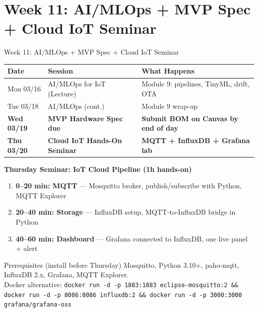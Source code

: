\documentclass[aspectratio=169,11pt]{beamer}
\begin{document}
\section{Week 11: AI/MLOps + MVP Spec + Cloud IoT Seminar}

\begin{frame}{Week 11: AI/MLOps + MVP Spec + Cloud IoT Seminar}
    \begin{center}
    \footnotesize
    \begin{tabular}{lll}
        \toprule
        \textbf{Date} & \textbf{Session} & \textbf{What Happens} \\
        \midrule
        Mon 03/16 & AI/MLOps for IoT (Lecture) & Module 9: pipelines, TinyML, drift, OTA \\
        Tue 03/18 & AI/MLOps (cont.) & Module 9 wrap-up \\
        \textbf{Wed 03/19} & \textbf{MVP Hardware Spec due} & \textbf{Submit BOM on Canvas by end of day} \\
        \textbf{Thu 03/20} & \textbf{Cloud IoT Hands-On Seminar} & \textbf{MQTT + InfluxDB + Grafana lab} \\
        \bottomrule
    \end{tabular}
    \normalsize
    \end{center}

    \vspace{0.3cm}
    \textbf{Thursday Seminar: IoT Cloud Pipeline (1h hands-on)}

    \vspace{0.1cm}
    \begin{enumerate}
        \item \textbf{0--20 min: MQTT} --- Mosquitto broker, publish/subscribe with Python, MQTT Explorer
        \item \textbf{20--40 min: Storage} --- InfluxDB setup, MQTT-to-InfluxDB bridge in Python
        \item \textbf{40--60 min: Dashboard} --- Grafana connected to InfluxDB, one live panel + alert
    \end{enumerate}

    \vspace{0.1cm}
    \begin{exampleblock}{Prerequisites (install before Thursday)}
        Mosquitto, Python 3.10+, paho-mqtt, InfluxDB 2.x, Grafana, MQTT Explorer.\\
        Docker alternative: \texttt{\scriptsize docker run -d -p 1883:1883 eclipse-mosquitto:2 \&\& docker run -d -p 8086:8086 influxdb:2 \&\& docker run -d -p 3000:3000 grafana/grafana-oss}
    \end{exampleblock}
\end{frame}
\end{document}
